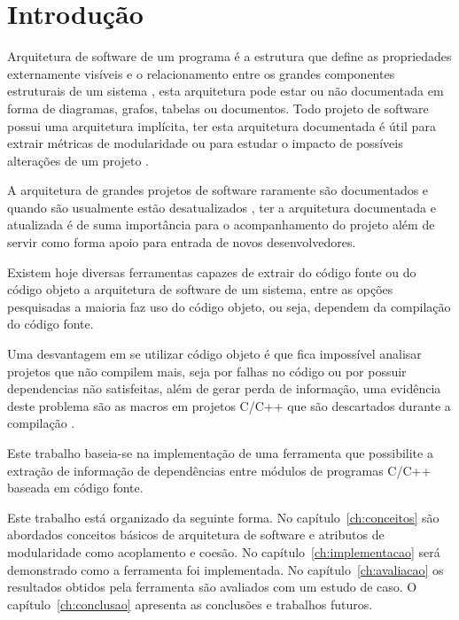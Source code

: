 \chapter{Introdução}

Arquitetura de software de um programa é a estrutura que define as propriedades
externamente visíveis e o relacionamento entre os grandes componentes
estruturais de um sistema \cite{engenhariaDeSoftwarePressman}, esta arquitetura
pode estar ou não documentada em forma de diagramas, grafos, tabelas ou
documentos.  Todo projeto de software possui uma arquitetura implícita, ter
esta arquitetura documentada é útil para extrair métricas de modularidade ou
para estudar o impacto de possíveis alterações de um projeto
\cite{mata26-terceiro-projeto-piloto}.

A arquitetura de grandes projetos de software raramente são documentados e
quando são usualmente estão desatualizados
\cite{sourceVersusObjectCodeExtraction}, ter a arquitetura documentada e
atualizada é de suma importância para o acompanhamento do projeto além de
servir como forma apoio para entrada de novos desenvolvedores.

Existem hoje diversas ferramentas capazes de extrair do código fonte ou do
código objeto a arquitetura de software de um sistema, entre as opções
pesquisadas \cite{sourceVersusObjectCodeExtraction} a maioria faz uso do
código objeto, ou seja, dependem da compilação do código fonte.

Uma desvantagem em se utilizar código objeto é que fica impossível analisar
projetos que não compilem mais, seja por falhas no código ou por possuir
dependencias não satisfeitas, além de gerar perda de informação, uma evidência
deste problema são as macros em projetos C/C++ que são descartados durante a
compilação \cite{sourceVersusObjectCodeExtraction}.

Este trabalho baseia-se na implementação de uma ferramenta que possibilite a
extração de informação de dependências entre módulos de programas C/C++ baseada
em código fonte.

Este trabalho está organizado da seguinte forma. No capítulo~\ref{ch:conceitos}
são abordados conceitos básicos de arquitetura de software e atributos de
modularidade como acoplamento e coesão. No capítulo~\ref{ch:implementacao} será
demonstrado como a ferramenta foi implementada. No capítulo~\ref{ch:avaliacao}
os resultados obtidos pela ferramenta são avaliados com um estudo de caso. O
capítulo~\ref{ch:conclusao} apresenta as conclusões e trabalhos futuros.


